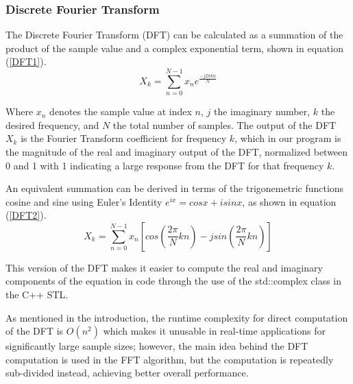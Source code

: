 \documentclass[journal]{IEEEtran}
\begin{document}
\subsubsection{Discrete Fourier Transform}
	\par{
		The Discrete Fourier Transform (DFT) can be calculated as 
		a summation of the product of the sample value and a complex
		exponential term, shown in equation (\ref{DFT1}).
	}
		\begin{equation}\label{DFT1}
			\displaystyle X_k = 
			\sum_{n=0}^{N-1}x_ne^{\displaystyle\frac{-j2 \pi kn}{N}}
		\end{equation}
	\par{
		Where $x_n$ denotes the sample value at index $n$, $j$ the imaginary
		number, $k$ the desired frequency, and $N$ the total number of samples.
		The output of the DFT $X_k$ is the Fourier Transform coefficient for
		frequency $k$, which in our program is the magnitude of the real 
		and imaginary output of the DFT, normalized between 0 and 1 with 1
		indicating a large response from the DFT for that frequency $k$.
	}
	\par{
		An equivalent summation can be derived in terms of the trigonemetric
		functions cosine and sine using Euler's Identity $e^{ix}=cosx + isinx$,
		as shown in equation (\ref{DFT2}).
	}
		\begin{equation}\label{DFT2}
			\displaystyle X_k = \sum_{n=0}^{N-1}x_n[cos(\frac{2\pi}{N}kn) 
			- jsin(\frac{2\pi}{N}kn)]
		\end{equation}

	\par{
		This version of the DFT makes it easier to compute the real and
		imaginary components of the equation in code through the use of 
		the std::complex class in the C++ STL.
	}

	\par{
		As mentioned in the introduction, the runtime complexity for direct
		computation of the DFT is $O(n^2)$ which makes it unusable in real-time
		applications for significantly large sample sizes; however, the main
		idea behind the DFT computation is used in the FFT algorithm, but the 
		computation is repeatedly sub-divided instead, 
		achieving better overall performance.
	}

\end{document}
